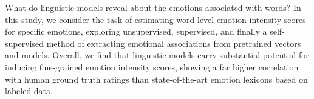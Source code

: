 What do linguistic models reveal about the emotions associated with words?  In this study, we consider the task of estimating word-level emotion intensity scores for specific emotions, exploring unsupervised, supervised, and finally a self-supervised method of extracting emotional associations from pretrained vectors and models. Overall, we find that linguistic models carry substantial potential for inducing fine-grained emotion intensity scores, showing a far higher correlation with human ground truth ratings than state-of-the-art emotion lexicons based on labeled data.
